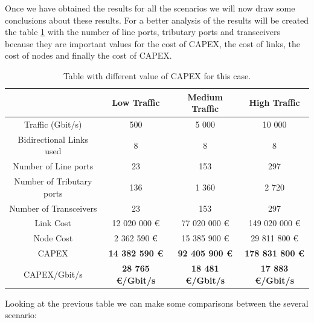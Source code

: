 Once we have obtained the results for all the scenarios we will now draw some conclusions about these results. For a better analysis of the results will be created the table \ref{table_comparative_opaque_surv_heuristic} with the number of line ports, tributary ports and transceivers because they are important values for the cost of CAPEX, the cost of links, the cost of nodes and finally the cost of CAPEX.\\

\begin{table}[H]
\centering
\begin{tabular}{| c | c | c | c |}
 \hline
   & Low Traffic & Medium Traffic  & High Traffic \\
 \hline\hline
 Traffic (Gbit/s) & 500 & 5 000 & 10 000 \\ \hline
 Bidirectional Links used & 8 & 8 & 8 \\ \hline
 Number of Line ports & 23 & 153 & 297 \\ \hline
 Number of Tributary ports & 136 & 1 360 & 2 720 \\ \hline
 Number of Transceivers & 23 & 153 & 297 \\ \hline
 Link Cost & 12 020 000 \euro & 77 020 000 \euro & 149 020 000 \euro \\ \hline
 Node Cost & 2 362 590 \euro & 15 385 900 \euro & 29 811 800 \euro \\ \hline
 CAPEX & \textbf{14 382 590 \euro} & \textbf{92 405 900 \euro} & \textbf{178 831 800 \euro} \\ \hline
 CAPEX/Gbit/s & \textbf{28 765 \euro/Gbit/s} & \textbf{18 481 \euro/Gbit/s} & \textbf{17 883 \euro/Gbit/s} \\
 \hline
\end{tabular}
\caption{Table with different value of CAPEX for this case.}
\label{table_comparative_opaque_surv_heuristic}
\end{table}

Looking at the previous table we can make some comparisons between the several scenario:

